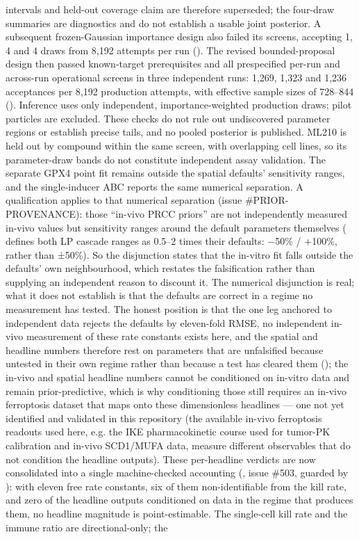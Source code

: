 \documentclass[11pt,twoside,openright]{report}
\begin{document}
\begin{enumerate}
intervals and held-out coverage claim are therefore superseded; the four-draw summaries are diagnostics and do not establish a usable joint posterior. A subsequent frozen-Gaussian importance design also failed its screens, accepting 1, 4 and 4 draws from 8,192 attempts per run (). The revised bounded-proposal design then passed known-target prerequisites and all prespecified per-run and across-run operational screens in three independent runs: 1,269, 1,323 and 1,236 acceptances per 8,192 production attempts, with effective sample sizes of 728–844 (). Inference uses only independent, importance-weighted production draws; pilot particles are excluded. These checks do not rule out undiscovered parameter regions or establish precise tails, and no pooled posterior is published. ML210 is held out by compound within the same screen, with overlapping cell lines, so its parameter-draw bands do not constitute independent assay validation. The separate GPX4 point fit remains outside the spatial defaults' sensitivity ranges, and the single-inducer ABC reports the same numerical separation. A qualification applies to that numerical separation (issue \#PRIOR-PROVENANCE): those ``in-vivo PRCC priors'' are not independently measured in-vivo values but sensitivity ranges around the default parameters themselves ( defines both LP cascade ranges as 0.5–2 times their defaults: $-$50\% / +100\%, rather than ±50\%). So the disjunction states that the in-vitro fit falls outside the defaults' own neighbourhood, which restates the falsification rather than supplying an independent reason to discount it. The numerical disjunction is real; what it does not establish is that the defaults are correct in a regime no measurement has tested. The honest position is that the one leg anchored to independent data rejects the defaults by eleven-fold RMSE, no independent in-vivo measurement of these rate constants exists here, and the spatial and headline numbers therefore rest on parameters that are unfalsified because untested in their own regime rather than because a test has cleared them (); the in-vivo and spatial headline numbers cannot be conditioned on in-vitro data and remain prior-predictive, which is why conditioning those still requires an in-vivo ferroptosis dataset that maps onto these dimensionless headlines --- one not yet identified and validated in this repository (the available in-vivo ferroptosis readouts used here, e.g. the IKE pharmacokinetic course used for tumor-PK calibration and in-vivo SCD1/MUFA data, measure different observables that do not condition the headline outputs). These per-headline verdicts are now consolidated into a single machine-checked accounting (, issue \#503, guarded by ): with eleven free rate constants, six of them non-identifiable from the kill rate, and zero of the headline outputs conditioned on data in the regime that produces them, no headline magnitude is point-estimable. The single-cell kill rate and the immune ratio are directional-only; the 
\end{enumerate}
\end{document}
